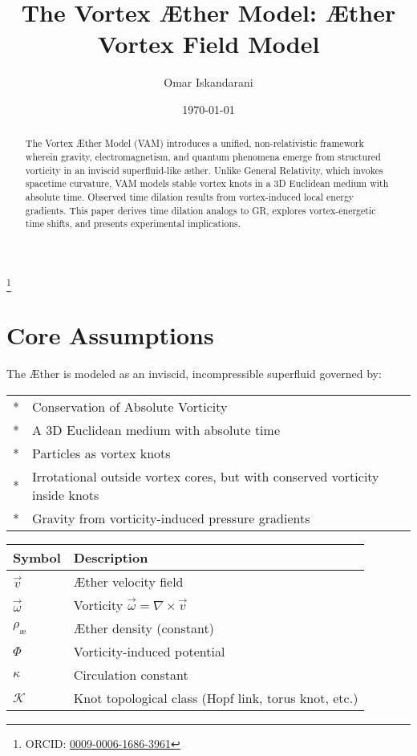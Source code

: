 \documentclass[aps,preprint,superscriptaddress]{revtex4}
\begin{document}
\sloppy %
\author{Omar Iskandarani}
\title{The Vortex Æther Model: Æther Vortex Field Model}
\date{\today}
\thanks{ORCID: \href{https://orcid.org/0009-0006-1686-3961}{0009-0006-1686-3961}}




\begin{abstract}
    The Vortex Æther Model (VAM) introduces a unified, non-relativistic framework wherein gravity, electromagnetism, and quantum phenomena emerge from structured vorticity in an inviscid superfluid-like æther. Unlike General Relativity, which invokes spacetime curvature, VAM models stable vortex knots in a 3D Euclidean medium with absolute time. Observed time dilation results from vortex-induced local energy gradients. This paper derives time dilation analogs to GR, explores vortex-energetic time shifts, and presents experimental implications.
\end{abstract}


\maketitle
    \section*{Core Assumptions}
    The Æther is modeled as an inviscid, incompressible superfluid governed by:

\begin{tabular}{ll}
    \toprule
    \midrule
        * & Conservation of Absolute Vorticity \\
        * & A 3D Euclidean medium with absolute time \\
        * & Particles as vortex knots \\
        * & Irrotational outside vortex cores, but with conserved vorticity inside knots \\
        * & Gravity from vorticity-induced pressure gradients \\
    \bottomrule
\end{tabular}


    \begin{tabular}{ll}
        \toprule
        Symbol & Description \\
        \midrule
        \(\vec{v}\) & Æther velocity field \\
        \(\vec{\omega}\) &  Vorticity \(\vec{\omega} = \nabla \times \vec{v}\) \\
        \(\rho_\text{æ}\) & Æther density (constant) \\
        \(\Phi\) & Vorticity-induced potential \\
        \(\kappa\) & Circulation constant \\
        \(\mathcal{K}\) & Knot topological class (Hopf link, torus knot, etc.) \\
        \bottomrule
    \end{tabular}
\end{document}
